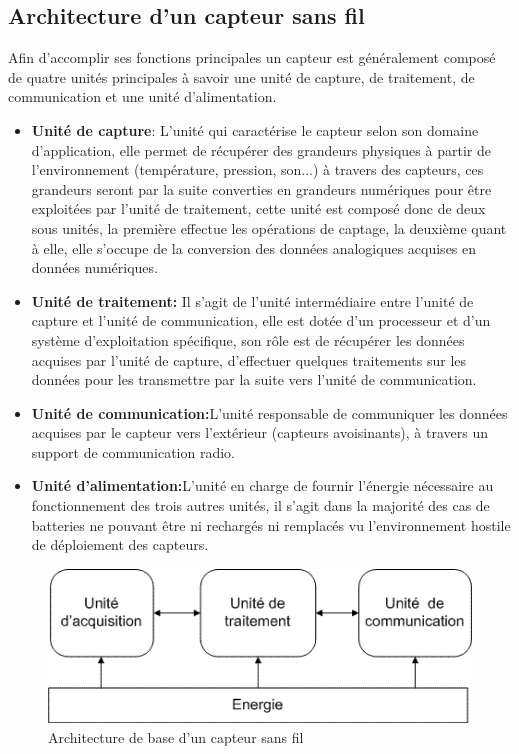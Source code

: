 	\subsection{Architecture d'un capteur sans fil}
	Afin d'accomplir ses fonctions principales un capteur est généralement composé de quatre unités principales à savoir une unité de capture, de traitement, de communication et une unité d'alimentation.
	\begin{itemize}
		\item \textbf{Unité de capture}: L'unité qui caractérise le capteur selon son domaine d'application, elle permet de récupérer des grandeurs physiques à partir de l'environnement (température, pression, son...) à travers des capteurs, ces grandeurs seront par la suite converties en grandeurs numériques pour être exploitées par l'unité de traitement, cette unité est composé donc de deux sous unités, la première effectue les opérations de captage, la deuxième quant à elle, elle s'occupe de la conversion des données analogiques acquises en données numériques. 

		
		\item \textbf{Unité de traitement:} Il s'agit de l'unité intermédiaire entre l'unité de capture et l'unité de communication, elle est dotée d'un processeur et d'un système d'exploitation spécifique, son rôle est de récupérer les données acquises par l'unité de capture, d'effectuer quelques traitements sur les données pour les transmettre par la suite vers l'unité de communication.
		
		
		\item \textbf{Unité de communication:}L'unité responsable de communiquer les données acquises par le capteur vers l'extérieur (capteurs avoisinants), à travers un support de communication radio. 

		
		\item \textbf{Unité d'alimentation:}L'unité en charge de fournir l'énergie nécessaire au fonctionnement des trois autres unités, il s'agit dans la majorité des cas de batteries ne pouvant être ni rechargés ni remplacés vu l'environnement hostile de déploiement des capteurs.
	\end{itemize}
	
	
	
	
	\begin{figure}[h]
		\begin{center}
			\includegraphics[scale=0.7]{Chapitre1/architecture_capteur.png}
		\end{center}
		\caption{Architecture de base d'un capteur sans fil}
	\end{figure}
	
